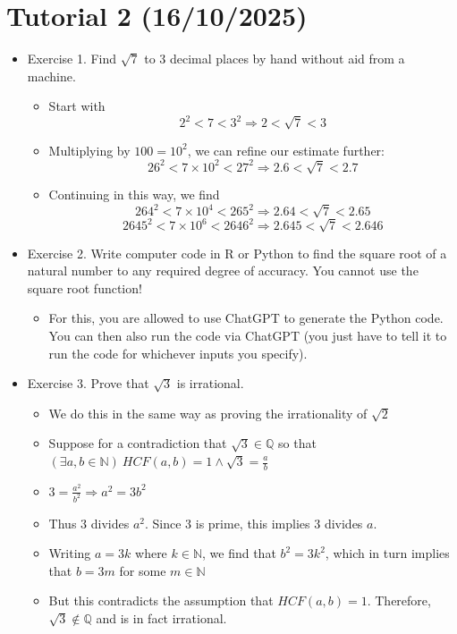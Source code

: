 \documentclass{article}
\begin{document}
\section{Tutorial 2 (16/10/2025)}
\begin{itemize}
    \item Exercise 1. Find $\sqrt{7}$ to 3 decimal places by hand without aid from a machine.
    \begin{itemize}
        \item Start with
        \[2^2 < 7 < 3^2 \Rightarrow 2 < \sqrt{7} < 3
        \]
        \item Multiplying by $100=10^2$, we can refine our estimate further:
        \[
        26^2 < 7 \times 10^2 < 27^2 \Rightarrow 2.6 < \sqrt{7} < 2.7
        \]
        \item Continuing in this way, we find
        \[
        264^2 < 7 \times 10^4 < 265^2 \Rightarrow 2.64 < \sqrt{7} < 2.65
        \]
        \[
        2645^2 < 7 \times 10^6 < 2646^2 \Rightarrow 2.645 < \sqrt{7} < 2.646
        \]
    \end{itemize}
    \item Exercise 2. Write computer code in R or Python to find the square root of a natural number to any required degree of accuracy. You cannot use the square root function!
    \begin{itemize}
        \item For this, you are allowed to use ChatGPT to generate the Python code. You can then also run the code via ChatGPT (you just have to tell it to run the code for whichever inputs you specify).
    \end{itemize}
    \item Exercise 3. Prove that $\sqrt{3}$ is irrational.
    \begin{itemize}
        \item We do this in the same way as proving the irrationality of $\sqrt{2}$
        \item Suppose for a contradiction that $\sqrt{3} \in \mathbb{Q}$ so that $(\exists a,b \in \mathbb{N}) \ HCF(a,b) = 1 \wedge \sqrt{3} = \frac{a}{b}$
        \item $3 = \frac{a^2}{b^2} \Rightarrow a^2 = 3b^2$
        \item Thus $3$ divides $a^2$. Since $3$ is prime, this implies $3$ divides $a$.
        \item Writing $a = 3k$ where $k \in \mathbb{N}$, we find that $b^2 = 3k^2$, which in turn implies that $b = 3m$ for some $m \in \mathbb{N}$
        \item But this contradicts the assumption that $HCF(a,b)=1$. Therefore, $\sqrt{3} \notin \mathbb{Q}$ and is in fact irrational.

\end{itemize}
\end{itemize}
\end{document}
